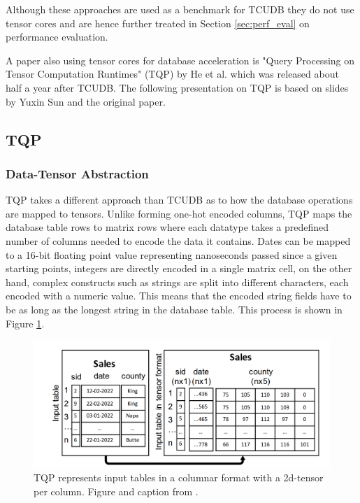 \documentclass{paper}
\begin{document}
	Although these approaches are used as a benchmark for TCUDB they do not use tensor cores and are hence further treated in Section \ref{sec:perf_eval} on performance evaluation.
	
	A paper also using tensor cores for database acceleration is "Query Processing on Tensor Computation Runtimes" (TQP) \cite{he2022query} by He et al. which was released about half a year after TCUDB. The following presentation on TQP is based on slides by Yuxin Sun \cite{sun_2022} and the original paper.
	
	\subsection{TQP}
	
	\subsubsection{Data-Tensor Abstraction}
	
	TQP takes a different approach than TCUDB as to how the database operations are mapped to tensors. Unlike forming one-hot encoded columns, TQP maps the database table rows to matrix rows where each datatype takes a predefined number of columns needed to encode the data it contains. Dates can be mapped to a 16-bit floating point value representing nanoseconds passed since a given starting points, integers are directly encoded in a single matrix cell, on the other hand, complex constructs such as strings are split into different characters, each encoded with a numeric value. This means that the encoded string fields have to be as long as the longest string in the database table. This process is shown in Figure \ref{fig:otherpaper}.
	
	
	\begin{figure}
		\centering
		\includegraphics[width=0.9\linewidth]{otherPaper}
		\caption{TQP represents input tables in a columnar format with a 2d-tensor per column. Figure and caption from \cite{he2022query}.}
		\label{fig:otherpaper}
	\end{figure}
	
\end{document}
